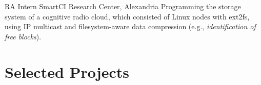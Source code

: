 \documentclass[letterpaper]{twentysecondcv} %
\begin{document}
\begin{twenty}
               {RA Intern}
               {SmartCI Research Center, Alexandria}
               {Programming the storage system of a cognitive radio cloud, which consisted of
                Linux nodes with ext2fs, using IP multicast and filesystem-aware data compression 
                (e.g., \textit{identification of free blocks}).}

\end{twenty}


\section{Selected Projects}
\end{document}
